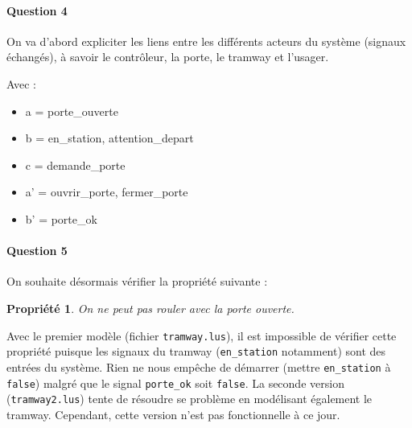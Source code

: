 \documentclass[a4paper, 11pt]{article}
\newtheorem{propriete}{Propriété}
\begin{document}
\paragraph{Question 4}
On va d'abord expliciter les liens entre les différents acteurs du système (signaux échangés), à savoir le contrôleur, la porte, le tramway et l'usager.\newline
\begin{center}
\end{center}

Avec :
\begin{itemize}
  \item a = porte\_ouverte
  \item b = en\_station, attention\_depart
  \item c = demande\_porte
  \item a' = ouvrir\_porte, fermer\_porte
  \item b' = porte\_ok
\end{itemize}

\paragraph{Question 5}
On souhaite désormais vérifier la propriété suivante :
\begin{propriete}
  On ne peut pas rouler avec la porte ouverte.
\end{propriete}
Avec le premier modèle (fichier \texttt{tramway.lus}), il est impossible de vérifier cette propriété puisque les signaux du tramway (\texttt{en\_station} notamment) sont des entrées du système. Rien ne nous empêche de démarrer (mettre \texttt{en\_station} à \texttt{false}) malgré que le signal \texttt{porte\_ok} soit \texttt{false}. La seconde version (\texttt{tramway2.lus}) tente de résoudre se problème en modélisant également le tramway. Cependant, cette version n'est pas fonctionnelle à ce jour.
\end{document}
